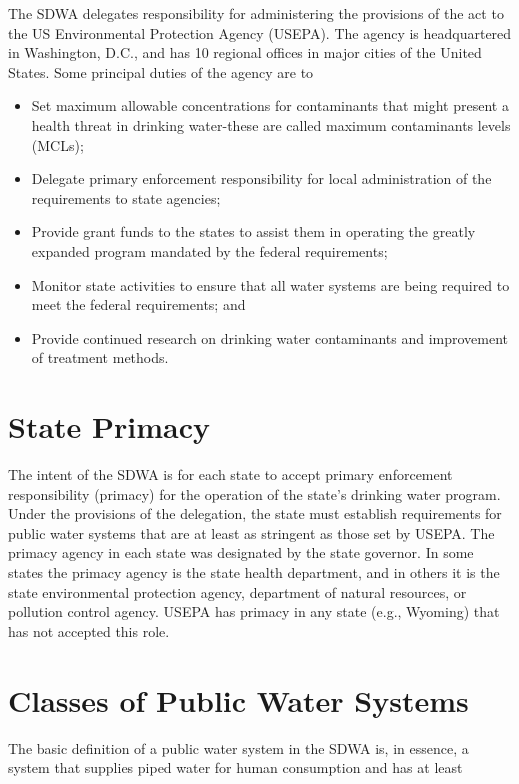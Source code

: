 \documentclass[10pt]{article}
\begin{document}
The SDWA delegates responsibility for administering the provisions of the act to the US Environmental Protection Agency (USEPA). The agency is headquartered in Washington, D.C., and has 10 regional offices in major cities of the United States. Some principal duties of the agency are to

\begin{itemize}
  \item Set maximum allowable concentrations for contaminants that might present a health threat in drinking water-these are called maximum contaminants levels (MCLs);

  \item Delegate primary enforcement responsibility for local administration of the requirements to state agencies;

  \item Provide grant funds to the states to assist them in operating the greatly expanded program mandated by the federal requirements;

  \item Monitor state activities to ensure that all water systems are being required to meet the federal requirements; and

  \item Provide continued research on drinking water contaminants and improvement of treatment methods.

\end{itemize}
\section{State Primacy}
The intent of the SDWA is for each state to accept primary enforcement responsibility (primacy) for the operation of the state's drinking water program. Under the provisions of the delegation, the state must establish requirements for public water systems that are at least as stringent as those set by USEPA. The primacy agency in each state was designated by the state governor. In some states the primacy agency is the state health department, and in others it is the state environmental protection agency, department of natural resources, or pollution control agency. USEPA has primacy in any state (e.g., Wyoming) that has not accepted this role.

\section{Classes of Public Water Systems}
The basic definition of a public water system in the SDWA is, in essence, a system that supplies piped water for human consumption and has at least
\end{document}
